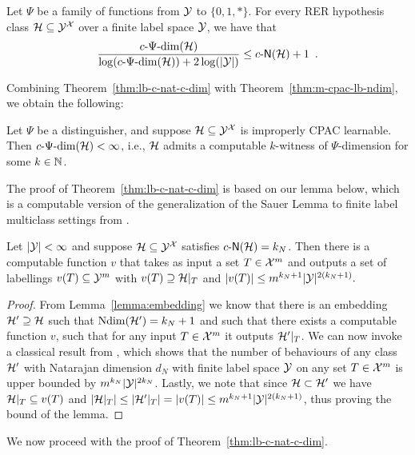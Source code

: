 \documentclass[11pt]{article}
\begin{document}
\begin{theorem}
\label{thm:lb-c-nat-c-dim}
    Let $\Psi$ be a family of functions from $\mathcal{Y}$ to $\{0,1,*\}$.
    For every RER hypothesis class $\mathcal{H} \subseteq \mathcal{Y}^{\mathcal{X}}$ over a finite label space $\mathcal{Y}$, we have that $$ \frac{c\text{-}\Psi\text{-}\mathrm{dim}(\mathcal{H})}{\log(c\text{-}\Psi\text{-}\mathrm{dim}(\mathcal{H})) + 2\log(|\mathcal{Y}|)} \leq c\text{-}\mathsf{N}(\mathcal{H}) +1 \enspace.$$
\end{theorem}

Combining Theorem~\ref{thm:lb-c-nat-c-dim} with Theorem~\ref{thm:m-cpac-lb-ndim}, we obtain the following:

\begin{corollary}
\label{cor:c-psi-dim-necessary}
    Let $\Psi$ be a distinguisher, and suppose $\mathcal{H}\subseteq\mathcal{Y}^{\mathcal{X}}$ is improperly CPAC learnable. 
    Then $c\text{-}\Psi\text{-}\mathrm{dim}(\mathcal{H})<\infty$, i.e., $\mathcal{H}$ admits a computable $k$-witness of $\Psi$-dimension for some $k\in\mathbb{N}$.
\end{corollary}

The proof of Theorem~\ref{thm:lb-c-nat-c-dim} is based  on our lemma below, which is a computable version of the generalization of the Sauer Lemma to finite label multiclass settings from \citep{natarajan1989learning}.


\begin{lemma}\label{lemma:natarajansauer}
    Let $|\mathcal{Y}| < \infty$ and suppose  $\mathcal{H}\subseteq\mathcal{Y}^{\mathcal{X}}$ satisfies $c\text{-}\mathsf{N}(\mathcal{H})= k_N$.
    Then there is a computable function $v$ that takes as input a set $T\in \mathcal{X}^m$ and outputs a set of labellings $v(T) \subseteq \mathcal{Y}^m$ with 
     $v(T) \supseteq \mathcal{H}|_{T}$  and 
       $|v(T)| \leq m^{k_N+1}|\mathcal{Y}|^{2(k_N+1)}.$
\end{lemma}

\begin{proof}
    From Lemma~\ref{lemma:embedding} we know that there is an embedding $\mathcal{H}' \supseteq \mathcal{H}$ such that $\mathrm{Ndim}(\mathcal{H}') = k_N+1$ and such that there exists a computable function $v$, such that for any input $T\in \mathcal{X}^m$ it outputs $\mathcal{H}'|_T$. We can now invoke a classical result from \citep{natarajan1989learning}, which shows that the number of behaviours of any class $\mathcal{H}'$ with Natarajan dimension $d_N$ with finite label space $\mathcal{Y}$ on any set $T\in \mathcal{X}^m$ is upper bounded by $m^{k_N}|\mathcal{Y}|^{2k_N}$.
    Lastly, we note that since $\mathcal{H} \subset \mathcal{H}'$ we have $\mathcal{H}|_T \subseteq v(T)$ and  $|\mathcal{H}|_T| \leq |\mathcal{H}'|_T| = |v(T)| \leq m^{k_N+1}|\mathcal{Y}|^{2(k_N+1)}$, thus proving the bound of the lemma.
\end{proof}

We now proceed with the proof of Theorem~\ref{thm:lb-c-nat-c-dim}.
\end{document}
